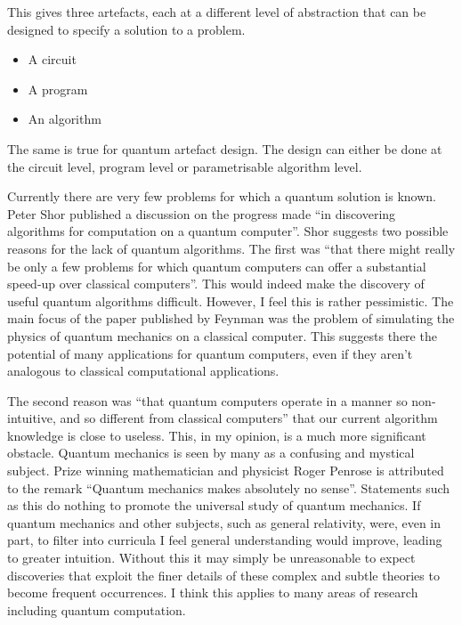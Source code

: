 This gives three artefacts, each at a different level of abstraction that can be designed to specify a solution to a problem.
\begin{itemize}
 \item A circuit
 \item A program
 \item An algorithm
\end{itemize}

The same is true for quantum artefact design.
The design can either be done at the circuit level, program level or parametrisable algorithm level.

Currently there are very few problems for which a quantum solution is known.
Peter Shor published a discussion on the progress made ``in discovering algorithms for computation on a quantum computer''\cite{Shor:2004:PQA:1032132.1032149}.
Shor suggests two possible reasons for the lack of quantum algorithms.
The first was ``that there might really be only a few problems for which quantum computers can offer a substantial speed-up over classical computers''\cite{Shor:2004:PQA:1032132.1032149}.
This would indeed make the discovery of useful quantum algorithms difficult.
However, I feel this is rather pessimistic.
The main focus of the paper published by Feynman\cite{Feynman82simulatingphysics} was the problem of simulating the physics of quantum mechanics on a classical computer.
This suggests there the potential of many applications for quantum computers, even if they aren't analogous to classical computational applications.

The second reason was ``that quantum computers operate in a manner so non-intuitive, and so different from classical computers''\cite{Shor:2004:PQA:1032132.1032149} that our current algorithm knowledge is close to useless.
This, in my opinion, is a much more significant obstacle.
Quantum mechanics is seen by many as a confusing and mystical subject.
Prize winning mathematician and physicist Roger Penrose is attributed to the remark ``Quantum mechanics makes absolutely no sense''.
Statements such as this do nothing to promote the universal study of quantum mechanics.
If quantum mechanics and other subjects, such as general relativity, were, even in part, to filter into curricula I feel general understanding would improve, leading to greater intuition.
Without this it may simply be unreasonable to expect discoveries that exploit the finer details of these complex and subtle theories to become frequent occurrences.
I think this applies to many areas of research including quantum computation.


